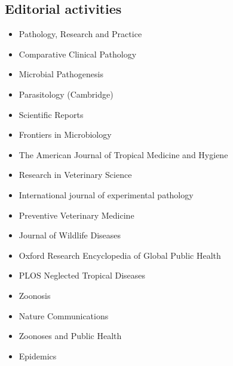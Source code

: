 \documentclass[11pt]{article}
\begin{document}
\subsection{Editorial activities}

\begin{itemize}
  \item Pathology, Research and Practice
  \item Comparative Clinical Pathology
  \item Microbial Pathogenesis 
  \item Parasitology (Cambridge) 
  \item Scientific Reports 
  \item Frontiers in Microbiology 
  \item The American Journal of Tropical Medicine and Hygiene
  \item Research in Veterinary Science
  \item International journal of experimental pathology 
  \item Preventive Veterinary Medicine 
  \item Journal of Wildlife Diseases  
  \item Oxford Research Encyclopedia of Global Public Health
  \item PLOS Neglected Tropical Diseases
  \item Zoonosis 
  \item Nature Communications
  \item Zoonoses and Public Health
  \item Epidemics
\end{itemize}
\end{document}
